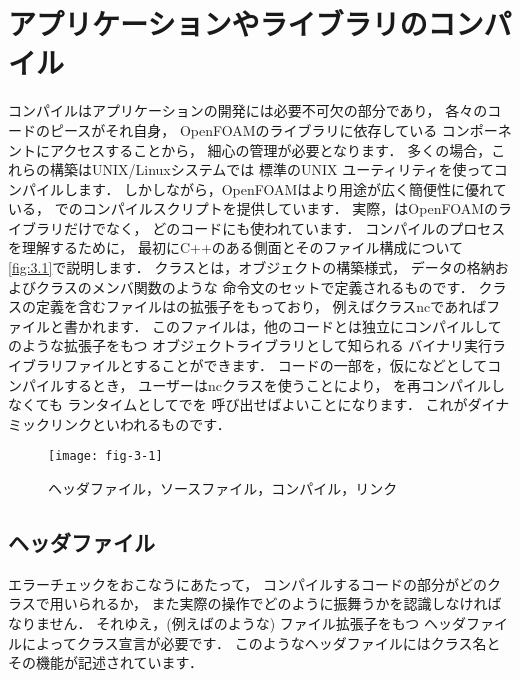\section{アプリケーションやライブラリのコンパイル}
\label{sec:3.2}
コンパイルはアプリケーションの開発には必要不可欠の部分であり，
各々のコードのピースがそれ自身，
OpenFOAMのライブラリに依存している
コンポーネントにアクセスすることから，
細心の管理が必要となります．
多くの場合，これらの構築はUNIX/Linuxシステムでは
標準のUNIX
%
%
ユーティリティを使ってコンパイルします．
しかしながら，OpenFOAMはより用途が広く簡便性に優れている，
%
%
でのコンパイルスクリプトを提供しています．
実際，はOpenFOAMのライブラリだけでなく，
どのコードにも使われています．
コンパイルのプロセスを理解するために，
最初にC++のある側面とそのファイル構成について
\autoref{fig:3.1}で説明します．
クラスとは，オブジェクトの構築様式，
データの格納およびクラスのメンバ関数のような
命令文のセットで定義されるものです．
クラスの定義を含むファイルはの拡張子をもっており，
例えばクラスncであればファイルと書かれます．
このファイルは，他のコードとは独立にコンパイルして
のような拡張子をもつ
オブジェクトライブラリとして知られる
バイナリ実行ライブラリファイルとすることができます．
コードの一部を，仮になどとしてコンパイルするとき，
ユーザーはncクラスを使うことにより，
を再コンパイルしなくても
ランタイムとしてでを
呼び出せばよいことになります．
これがダイナミックリンクといわれるものです．


\begin{figure}[ht]
 \texttt{[image: fig-3-1]}
 \caption{ヘッダファイル，ソースファイル，コンパイル，リンク}
 \label{fig:3.1}
\end{figure}


\subsection{ヘッダファイル}
\label{ssec:3.2.1}
エラーチェックをおこなうにあたって，
コンパイルするコードの部分がどのクラスで用いられるか，
また実際の操作でどのように振舞うかを認識しなければなりません．
それゆえ，(例えばのような) ファイル拡張子をもつ
ヘッダファイルによってクラス宣言が必要です．
このようなヘッダファイルにはクラス名とその機能が記述されています．

